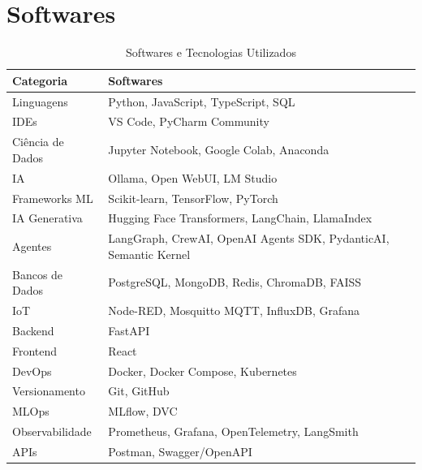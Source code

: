 \section{Softwares}

\begin{table}[htb]
\centering
\renewcommand{\arraystretch}{1.3} %
\begin{tabular}{|l|p{10cm}|}
\hline
\textbf{Categoria} & \textbf{Softwares} \\
\hline
Linguagens & Python, JavaScript, TypeScript, SQL \\
\hline
IDEs & VS Code, PyCharm Community \\
\hline
Ciência de Dados & Jupyter Notebook, Google Colab, Anaconda \\
\hline
IA & Ollama, Open WebUI, LM Studio \\
\hline
Frameworks ML & Scikit-learn, TensorFlow, PyTorch \\
\hline
IA Generativa & Hugging Face Transformers, LangChain, LlamaIndex \\
\hline
Agentes & LangGraph, CrewAI, OpenAI Agents SDK, PydanticAI, Semantic Kernel \\
\hline
Bancos de Dados & PostgreSQL, MongoDB, Redis, ChromaDB, FAISS \\
\hline
IoT & Node-RED, Mosquitto MQTT, InfluxDB, Grafana \\
\hline
Backend & FastAPI \\
\hline
Frontend & React \\
\hline
DevOps & Docker, Docker Compose, Kubernetes \\
\hline
Versionamento & Git, GitHub \\
\hline
MLOps & MLflow, DVC \\
\hline
Observabilidade & Prometheus, Grafana, OpenTelemetry, LangSmith \\
\hline
APIs & Postman, Swagger/OpenAPI \\
\hline
\end{tabular}
\caption{Softwares e Tecnologias Utilizados}
\label{tab:softwares_tecnologias}
\end{table}